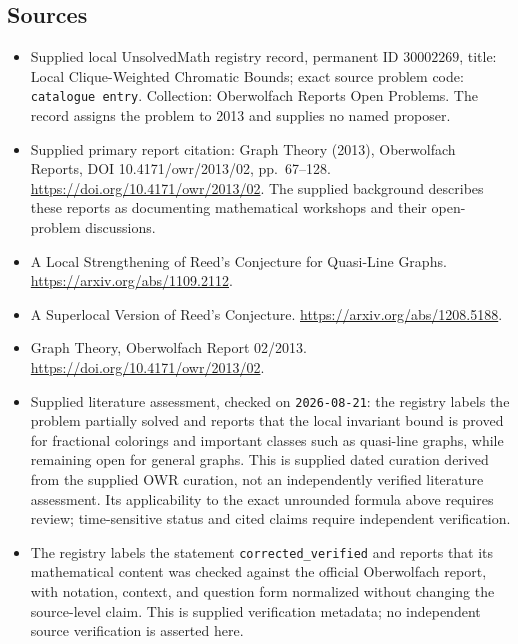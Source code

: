 \documentclass[11pt]{article}
\begin{document}
\subsection{Sources}
\begin{itemize}
\item Supplied local UnsolvedMath registry record, permanent ID \(30002269\), title: Local Clique-Weighted Chromatic Bounds; exact source problem code: \texttt{catalogue entry}. Collection: Oberwolfach Reports Open Problems. The record assigns the problem to 2013 and supplies no named proposer.
\item Supplied primary report citation: Graph Theory (2013), Oberwolfach Reports, DOI 10.4171/owr/2013/02, pp.\ 67--128. \url{https://doi.org/10.4171/owr/2013/02}. The supplied background describes these reports as documenting mathematical workshops and their open-problem discussions.
\item A Local Strengthening of Reed's Conjecture for Quasi-Line Graphs. \url{https://arxiv.org/abs/1109.2112}.
\item A Superlocal Version of Reed's Conjecture. \url{https://arxiv.org/abs/1208.5188}.
\item Graph Theory, Oberwolfach Report 02/2013. \url{https://doi.org/10.4171/owr/2013/02}.
\item Supplied literature assessment, checked on \texttt{2026-08-21}: the registry labels the problem partially solved and reports that the local invariant bound is proved for fractional colorings and important classes such as quasi-line graphs, while remaining open for general graphs. This is supplied dated curation derived from the supplied OWR curation, not an independently verified literature assessment. Its applicability to the exact unrounded formula above requires review; time-sensitive status and cited claims require independent verification.
\item The registry labels the statement \texttt{corrected\_verified} and reports that its mathematical content was checked against the official Oberwolfach report, with notation, context, and question form normalized without changing the source-level claim. This is supplied verification metadata; no independent source verification is asserted here.
\end{itemize}
\end{document}

